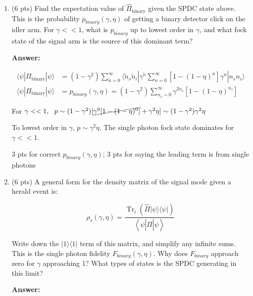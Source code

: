 \documentclass[11pt]{caltech_thesis} %
\begin{document}
\begin{enumerate}
\def\labelenumi{\arabic{enumi}.}
\item
  (6 pts) Find the expectation value of \(\hat{\Pi}_{\text {binary}}\)
  given the SPDC state above. This is the probability
  \(p_{binary}\left(\gamma, \eta\right)\) of getting a binary detector
  click on the idler arm. For \(\gamma << 1\), what is \(p_{binary}\) up
  to lowest order in \(\gamma\), and what fock state of the signal arm
  is the source of this dominant term?

  {\color{midnightblue}  \textbf{Answer:} }

  {\color{midnightblue} 

  \[\begin{aligned}
   \langle \psi | \Pi_{\text {binary}} | \psi \rangle &= (1- \gamma^2) \sum_{\tilde{n}=0}^{\infty} \langle \tilde{n}_s \tilde{n}_i | \gamma^{\tilde{n}} \sum_{n=0}^{\infty}[1 - (1-\eta)^{n}] \gamma^n | n_s n_i \rangle \\
   \langle \psi | \Pi_{\text {binary}} | \psi \rangle &= p_{binary}(\gamma, \eta) =  \boxed{(1-\gamma^2) \sum_{n_s=0}^{\infty} \gamma^{2n_s} [1 - (1 - \eta)^{n_s}]}
   \end{aligned}\]

  }

  {\color{midnightblue} For
  \(\gamma << 1, ~~ p \sim (1 - \gamma^2)[\cancel{\gamma^0[1 - (1 - \eta)^0]} + \gamma^{2}\eta ] \sim (1 - \gamma^2)\gamma^{2}\eta\)
  }

  {\color{midnightblue}  To lowest order in \(\gamma\),
  \(p \sim \gamma^{2}\eta\). The single photon fock state dominates for
  \(\gamma << 1\). }

  {\color{darkred}  3 pts for correct \(p_{binary}(\gamma, \eta)\); 3
  pts for saying the leading term is from single photons }
\item
  (6 pts) A general form for the density matrix of the signal mode given
  a herald event is:

  \[\rho_{s}\left(\gamma, \eta\right)=\frac{\operatorname{Tr}_{i}\left(\hat{\Pi}|\psi\rangle\langle\psi|\right)}{\left\langle\psi\left|\hat{\Pi}\right| \psi\right\rangle}\]

  Write down the \(|1\rangle\langle1|\) term of this matrix, and
  simplify any infinite sums. This is the single photon fidelity
  \(F_{binary}(\gamma, \eta)\). Why does \(F_{binary}\) approach zero
  for \(\gamma\) approaching 1? What types of states is the SPDC
  generating in this limit?

  {\color{midnightblue}  \textbf{Answer:} }


\end{enumerate}
\end{document}
